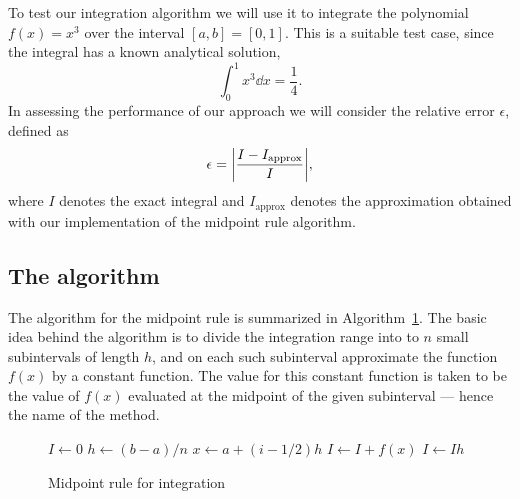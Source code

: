 \documentclass[../main_proj3.tex]{subfiles}
\begin{document}
To test our integration algorithm we will use it to integrate the polynomial $f(x) = x^3$ over the interval $[a,b] = [0,1]$. This is a suitable test case, since the integral has a known analytical solution,
\begin{equation}
    \int_0^1 x^3 \dd x = \frac{1}{4}.
\end{equation}
In assessing the performance of our approach we will consider the relative error $\epsilon$, defined as
\begin{equation}
    \epsilon = \abs{ \frac{I - I_{\text{approx}}}{I} },
\end{equation}
where $I$ denotes the exact integral and $I_\text{approx}$ denotes the approximation obtained with our implementation of the midpoint rule algorithm.

\subsection*{The algorithm}
%
The algorithm for the midpoint rule is summarized in Algorithm~\ref{algo:midpointrule}. The basic idea behind the algorithm is to divide the integration range into to $n$ small subintervals of length $h$, and on each such subinterval approximate the function $f(x)$ by a constant function. The value for this constant function is taken to be the value of $f(x)$ evaluated at the midpoint of the given subinterval --- hence the name of the method.
%
\begin{figure}
    \begin{algorithm}[H]
    \caption{Midpoint rule for integration}
    \label{algo:midpointrule}
        \begin{algorithmic}
            \State $I \leftarrow 0$        
            \State $h \leftarrow (b-a)/n$  
            \State $x \leftarrow a + (i-1/2)h$    %
            \State $I \leftarrow I + f(x)$   %
            \EndFor
            \State $I \leftarrow Ih$  
            \EndProcedure
        \end{algorithmic}
    \end{algorithm}
\end{figure}
\end{document}
